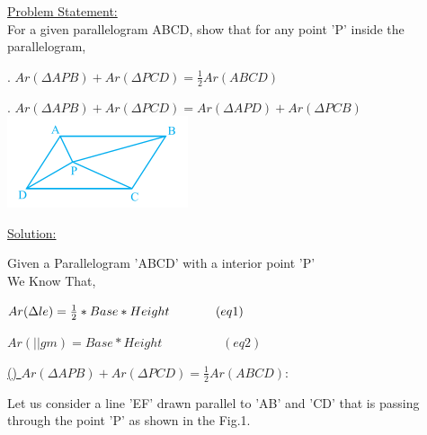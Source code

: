 \documentclass[10pt,a4paper]{report}
\begin{document}
{\begin{multicols}{2}
\raggedright \large \underline{Problem Statement:} \normalsize \vspace{5mm}
\\ \hspace{2cm} For a given parallelogram ABCD, show that for any point 'P' inside the parallelogram,\\ \vspace{5mm}\raggedright {}. $Ar(\Delta APB)+Ar(\Delta PCD) = \frac{1}{2}Ar(ABCD)$ \vspace{5mm} \\ 
\raggedright {}. $Ar(\Delta APB)+Ar(\Delta PCD)=Ar(\Delta APD)+Ar(\Delta PCB)$ \vspace{2mm} \\
\centering \includegraphics[scale=1.1]{Question.png} \vspace{2mm} \\
\raggedright \large \underline{Solution:} \normalsize \\ \vspace{1mm}
\raggedright Given a Parallelogram 'ABCD' with a interior point 'P'\\ We Know That,\\ \raggedright \hspace{2cm} $Ar(\Delta le) = \frac{1}{2}*Base*Height \hspace{1.3cm} (eq 1)$ \\ \hspace{2cm} \raggedright $Ar(||gm) = Base*Height \hspace{2cm} (eq 2)$ \vspace{3mm}
\\ \raggedright \underline{() $Ar(\Delta APB)+Ar(\Delta PCD) = \frac{1}{2}Ar(ABCD):$} \\ \vspace{1mm} \raggedright \hspace{1cm} Let us consider a line 'EF' drawn parallel to 'AB' and 'CD' that is passing through the point 'P' as shown in the Fig.1.\\

\end{multicols}}
\end{document}

